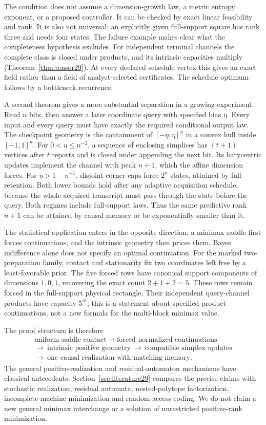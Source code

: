 The condition does not assume a dimension-growth law, a metric entropy
exponent, or a proposed controller. It can be checked by exact linear
feasibility and rank. It is also not universal: an explicitly given
full-support square has rank three and needs four states. The failure
example makes clear what the completeness hypothesis excludes.
For independent terminal channels the complete class is closed under
products, and its intrinsic capacities multiply
(Theorem~\ref{thm:tensor29}). At every declared schedule vertex this
gives an exact field rather than a field of analyst-selected
certificates. The schedule optimum follows by a bottleneck recurrence.

A second theorem gives a more substantial separation in a growing
experiment. Read $n$ bits, then answer a later coordinate query with
specified bias $\eta$. Every input and every query must have exactly
the required conditional output law. The checkpoint geometry is the
containment of $[-\eta,\eta]^n$ in a convex hull inside $[-1,1]^n$.
For $0<\eta\le n^{-2}$, a sequence of enclosing simplices has
$(t+1)$ vertices after $t$ reports and is closed under appending the
next bit. Its barycentric updates implement the channel with peak
$n+1$, which the affine dimension forces. For $\eta>1-n^{-1}$,
disjoint corner caps force $2^n$ states, attained by full retention.
Both lower bounds hold after any adaptive acquisition schedule,
because the whole acquired transcript must pass through the state
before the query. Both regimes include full-support laws. Thus the
same predictive rank $n+1$ can be attained by causal memory or be
exponentially smaller than it.

The statistical application enters in the opposite direction: a
minimax saddle first forces continuations, and the intrinsic geometry
then prices them. Bayes indifference alone does not specify an optimal
continuation. For the marked two-preparation family, contact and
stationarity fix two coordinates left free by a least-favorable prior.
The five forced rows have canonical support components of dimensions
$1,0,1$, recovering the exact count $2+1+2=5$. These rows remain forced
in the full-support physical rectangle. Their independent query-channel
products have capacity $5^m$; this is a statement about specified
product continuations, not a new formula for the multi-block minimax
value.

The proof structure is therefore
\[
\begin{gathered}
 \text{uniform saddle contact}
 \ \longrightarrow\ \text{forced normalized continuations}\\
 \longrightarrow\ \text{intrinsic positive geometry}
 \ \longrightarrow\ \text{compatible simplex updates}\\
 \longrightarrow\ \text{one causal realization with matching memory}.
\end{gathered}
\]
The general positive-realization and residual-automaton mechanisms have
classical antecedents. Section~\ref{sec:literature29} compares the
precise claims with stochastic realization, residual automata,
nested-polytope factorization, incomplete-machine minimization and
random-access coding. We do not claim a new general minimax interchange
or a solution of unrestricted positive-rank minimization.

